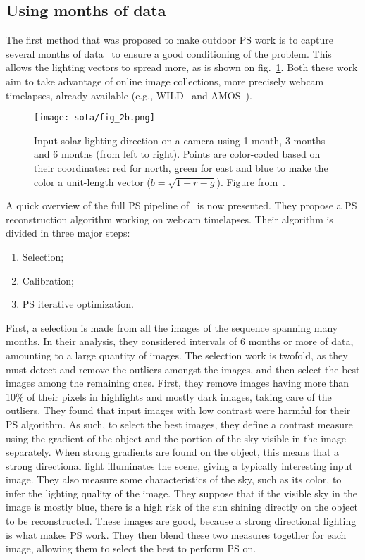 \subsection{Using months of data}
\label{sota:ops-months}

The first method that was proposed to make outdoor PS work is to capture several months of data~\cite{ackermann-cvpr-12,abrams-eccv-12} to ensure a good conditioning of the problem. This allows the lighting vectors to spread more, as is shown on fig.~\ref{fig:abrams-sunpath}. Both these work aim to take advantage of online image collections, more precisely webcam timelapses, already available (e.g., WILD~\cite{narasimhan-eccv-06} and AMOS~\cite{jacobs-cvpr-2007}).

\begin{figure}
\centering
\texttt{[image: sota/fig\_2b.png]}
\caption{Input solar lighting direction on a camera using 1 month, 3 months and 6 months (from left to right). Points are color-coded based on their coordinates: red for north, green for east and blue to make the color a unit-length vector ($b = \sqrt{1 - r - g}$). Figure from~\cite{abrams-eccv-12}.}
\label{fig:abrams-sunpath}
\end{figure}

A quick overview of the full PS pipeline of~\cite{ackermann-cvpr-12} is now presented. They propose a PS reconstruction algorithm working on webcam timelapses. Their algorithm is divided in three major steps:
\begin{enumerate}
  \item Selection;
  \item Calibration;
  \item PS iterative optimization.
\end{enumerate}%
First, a selection is made from all the images of the sequence spanning many months. In their analysis, they considered intervals of 6 months or more of data, amounting to a large quantity of images. The selection work is twofold, as they must detect and remove the outliers amongst the images, and then select the best images among the remaining ones. First, they remove images having more than 10\% of their pixels in highlights and mostly dark images, taking care of the outliers. They found that input images with low contrast were harmful for their PS algorithm. As such, to select the best images, they define a contrast measure using the gradient of the object and the portion of the sky visible in the image separately. When strong gradients are found on the object, this means that a strong directional light illuminates the scene, giving a typically interesting input image. They also measure some characteristics of the sky, such as its color, to infer the lighting quality of the image. They suppose that if the visible sky in the image is mostly blue, there is a high risk of the sun shining directly on the object to be reconstructed. These images are good, because a strong directional lighting is what makes PS work. They then blend these two measures together for each image, allowing them to select the best to perform PS on.


